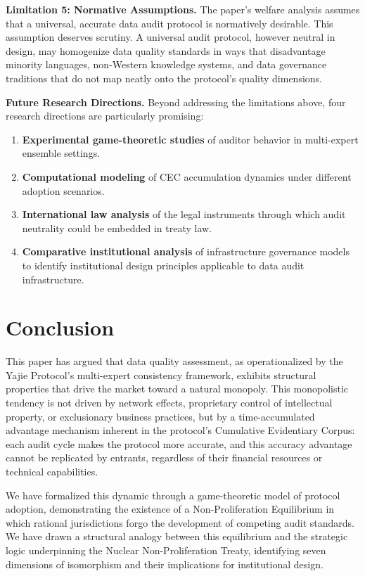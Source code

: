 \documentclass[12pt,a4paper]{article}
\theoremstyle{definition}
\theoremstyle{remark}
\begin{document}
\textbf{Limitation 5: Normative Assumptions.} The paper's welfare analysis assumes that a universal, accurate data audit protocol is normatively desirable. This assumption deserves scrutiny. A universal audit protocol, however neutral in design, may homogenize data quality standards in ways that disadvantage minority languages, non-Western knowledge systems, and data governance traditions that do not map neatly onto the protocol's quality dimensions.

\textbf{Future Research Directions.} Beyond addressing the limitations above, four research directions are particularly promising:
\begin{enumerate}
\item \textbf{Experimental game-theoretic studies} of auditor behavior in multi-expert ensemble settings.
\item \textbf{Computational modeling} of CEC accumulation dynamics under different adoption scenarios.
\item \textbf{International law analysis} of the legal instruments through which audit neutrality could be embedded in treaty law.
\item \textbf{Comparative institutional analysis} of infrastructure governance models to identify institutional design principles applicable to data audit infrastructure.
\end{enumerate}

\section{Conclusion}

This paper has argued that data quality assessment, as operationalized by the Yajie Protocol's multi-expert consistency framework, exhibits structural properties that drive the market toward a natural monopoly. This monopolistic tendency is not driven by network effects, proprietary control of intellectual property, or exclusionary business practices, but by a time-accumulated advantage mechanism inherent in the protocol's Cumulative Evidentiary Corpus: each audit cycle makes the protocol more accurate, and this accuracy advantage cannot be replicated by entrants, regardless of their financial resources or technical capabilities.

We have formalized this dynamic through a game-theoretic model of protocol adoption, demonstrating the existence of a Non-Proliferation Equilibrium in which rational jurisdictions forgo the development of competing audit standards. We have drawn a structural analogy between this equilibrium and the strategic logic underpinning the Nuclear Non-Proliferation Treaty, identifying seven dimensions of isomorphism and their implications for institutional design.
\end{document}
